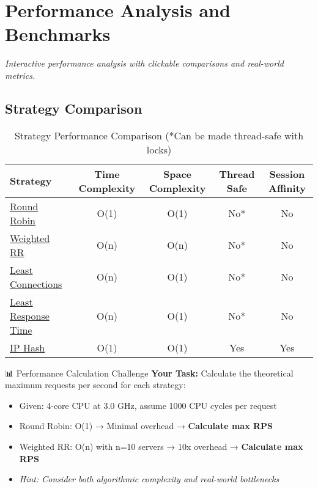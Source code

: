 \documentclass[12pt,a4paper]{article}
\begin{document}
\section{Performance Analysis and Benchmarks}
\label{sec:performance}

\textit{Interactive performance analysis with clickable comparisons and real-world metrics.}

\subsection{Strategy Comparison}

\begin{table}[H]
\centering
\small
\begin{tabular}{@{}lcccc@{}}
\toprule
\textbf{Strategy} & \textbf{Time Complexity} & \textbf{Space Complexity} & \textbf{Thread Safe} & \textbf{Session Affinity} \\
\midrule
\hyperref[subsec:roundrobin]{Round Robin} & O(1) & O(1) & No* & No \\
\hyperref[subsec:weighted]{Weighted RR} & O(n) & O(n) & No* & No \\
\hyperref[subsec:leastconn]{Least Connections} & O(n) & O(1) & No* & No \\
\hyperref[subsec:leastresponse]{Least Response Time} & O(n) & O(1) & No* & No \\
\hyperref[subsec:iphash]{IP Hash} & O(1) & O(1) & Yes & Yes \\
\bottomrule
\end{tabular}
\caption{Strategy Performance Comparison (*Can be made thread-safe with locks)}
\label{tab:strategy_comparison}
\end{table}

\begin{exercisebox}{📊 Performance Calculation Challenge}
\textbf{Your Task:} Calculate the theoretical maximum requests per second for each strategy:
\begin{itemize}
    \item Given: 4-core CPU at 3.0 GHz, assume 1000 CPU cycles per request
    \item Round Robin: O(1) → Minimal overhead → \textbf{Calculate max RPS}
    \item Weighted RR: O(n) with n=10 servers → 10x overhead → \textbf{Calculate max RPS}
    \item \textit{Hint: Consider both algorithmic complexity and real-world bottlenecks}
\end{itemize}
\end{exercisebox}
\end{document}
